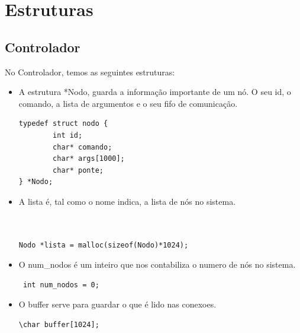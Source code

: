 \documentclass{report}
\begin{document}
\section{Estruturas}
\subsection{Controlador}
No Controlador, temos as seguintes estruturas:
\begin{itemize}
    \item A estrutura *Nodo, guarda a informação importante de um nó. O seu id, o comando, a lista de argumentos e o seu fifo de comunicação.
\begin{verbatim}
typedef struct nodo {
        int id;
        char* comando;
        char* args[1000];
        char* ponte;
} *Nodo;
\end{verbatim}
    \item A lista é, tal como o nome indica, a lista de nós no sistema.
\begin{verbatim}


Nodo *lista = malloc(sizeof(Nodo)*1024);
\end{verbatim}
    \item O num\_nodos é um inteiro que nos contabiliza o numero de nós no sistema. 
\begin{verbatim}
 int num_nodos = 0;
\end{verbatim}
    \item O buffer serve para guardar o que é lido nas conexoes.
\begin{verbatim}
\char buffer[1024];    
\end{verbatim}
\end{itemize}
\end{document}
